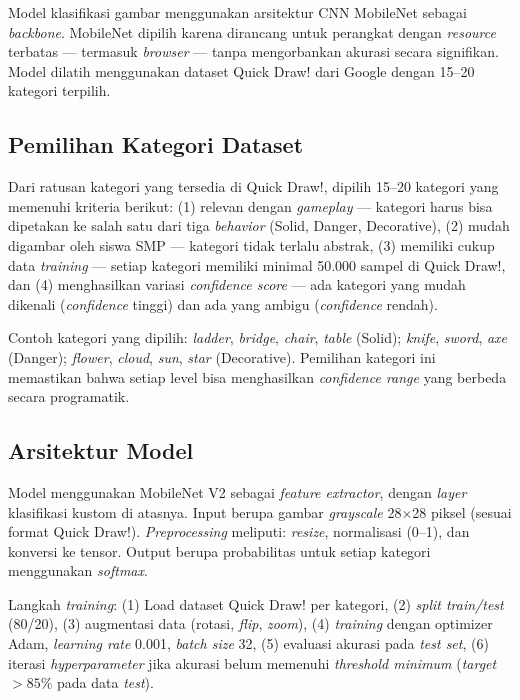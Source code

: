 \documentclass[10pt,twoside,openright]{report}
\begin{document}
Model klasifikasi gambar menggunakan arsitektur CNN MobileNet sebagai \textit{backbone}. MobileNet dipilih karena dirancang untuk perangkat dengan \textit{resource} terbatas --- termasuk \textit{browser} --- tanpa mengorbankan akurasi secara signifikan. Model dilatih menggunakan dataset Quick Draw! dari Google dengan 15--20 kategori terpilih.

\subsection{Pemilihan Kategori Dataset}

Dari ratusan kategori yang tersedia di Quick Draw!, dipilih 15--20 kategori yang memenuhi kriteria berikut: (1) relevan dengan \textit{gameplay} --- kategori harus bisa dipetakan ke salah satu dari tiga \textit{behavior} (Solid, Danger, Decorative), (2) mudah digambar oleh siswa SMP --- kategori tidak terlalu abstrak, (3) memiliki cukup data \textit{training} --- setiap kategori memiliki minimal 50.000 sampel di Quick Draw!, dan (4) menghasilkan variasi \textit{confidence score} --- ada kategori yang mudah dikenali (\textit{confidence} tinggi) dan ada yang ambigu (\textit{confidence} rendah).

Contoh kategori yang dipilih: \textit{ladder}, \textit{bridge}, \textit{chair}, \textit{table} (Solid); \textit{knife}, \textit{sword}, \textit{axe} (Danger); \textit{flower}, \textit{cloud}, \textit{sun}, \textit{star} (Decorative). Pemilihan kategori ini memastikan bahwa setiap level bisa menghasilkan \textit{confidence range} yang berbeda secara programatik.

\subsection{Arsitektur Model}

Model menggunakan MobileNet V2 sebagai \textit{feature extractor}, dengan \textit{layer} klasifikasi kustom di atasnya. Input berupa gambar \textit{grayscale} 28$\times$28 piksel (sesuai format Quick Draw!). \textit{Preprocessing} meliputi: \textit{resize}, normalisasi (0--1), dan konversi ke tensor. Output berupa probabilitas untuk setiap kategori menggunakan \textit{softmax}.

Langkah \textit{training}: (1) Load dataset Quick Draw! per kategori, (2) \textit{split train/test} (80/20), (3) augmentasi data (rotasi, \textit{flip}, \textit{zoom}), (4) \textit{training} dengan optimizer Adam, \textit{learning rate} 0.001, \textit{batch size} 32, (5) evaluasi akurasi pada \textit{test set}, (6) iterasi \textit{hyperparameter} jika akurasi belum memenuhi \textit{threshold minimum} (\textit{target} $>85\%$ pada data \textit{test}).
\end{document}
